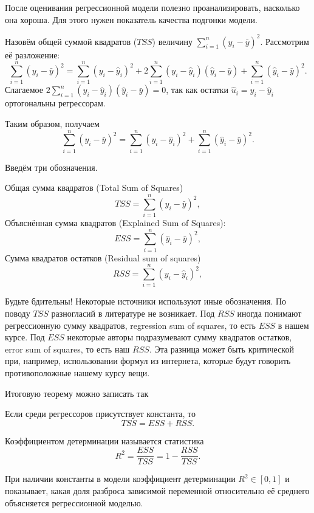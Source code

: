 \documentclass[12pt]{article}
\newcommand{\hu}{\hat{u}}
\newcommand{\hy}{\hat{y}}
\newcommand{\RSS}{RSS}
\newcommand{\ESS}{ESS}
\newcommand{\TSS}{TSS}
\begin{document}
После оценивания регрессионной модели полезно проанализировать, насколько она хороша. Для этого нужен показатель качества подгонки модели.

Назовём общей суммой квадратов ($\TSS$) величину $\sum_{i=1}^n (y_i - \bar{y})^2$. Рассмотрим её разложение:
\[
\sum_{i=1}^n (y_i - \bar{y})^2 = \sum_{i=1}^n (y_i - \hy_i)^2 + 2\sum_{i=1}^n (y_i - \hy_i)(\hy_i - \bar{y}) + \sum_{i=1}^n (\hy_i - \bar{y})^2.
\]
Слагаемое $2\sum_{i=1}^n (y_i - \hy_i)(\hy_i - \bar{y}) = 0$, так как остатки $\hu_i = y_i - \hy_i$ ортогональны регрессорам.

Таким образом, получаем
\[
\sum_{i=1}^n (y_i - \bar{y})^2 = \sum_{i=1}^n (y_i - \hy_i)^2 + \sum_{i=1}^n (\hy_i - \bar{y})^2.
\]

Введём три обозначения.


Общая сумма квадратов (Total Sum of Squares)
\[
\TSS = \sum_{i=1}^n (y_i - \bar{y})^2,
\]
Объяснённая сумма квадратов (Explained Sum of Squares):
\[
\ESS = \sum_{i=1}^n (\hy_i - \bar{y})^2,
\]
Сумма квадратов остатков (Residual sum of squares)
\[
\RSS = \sum_{i=1}^n (y_i - \hy_i)^2,
\]

Будьте бдительны! 
Некоторые источники используют иные обозначения. По поводу $\TSS$ разногласий в литературе не возникает. 
Под $\RSS$ иногда понимают регрессионную сумму квадратов, regression sum of squares, то есть $\ESS$ в нашем курсе. 
Под $\ESS$ некоторые авторы подразумевают сумму квадратов остатков, error sum of squares, то есть наш $\RSS$. 
Эта разница может быть критической при, например, использовании формул из интернета, которые будут говорить противоположные нашему курсу вещи.

Итоговую теорему можно записать так
\begin{theorem}
Если среди регрессоров присутствует константа, то
\[
\label{tss}
    \TSS = \ESS + \RSS.
\]
\end{theorem}

\begin{definition}
Коэффициентом детерминации называется статистика 
\[
R^2 = \frac{\ESS}{\TSS} = 1 - \frac{\RSS}{\TSS}.
\]    
\end{definition}



При наличии константы в модели коэффициент детерминации $R^2 \in [0,1]$ и показывает, какая доля разброса зависимой переменной относительно её среднего объясняется регрессионной моделью.


\end{document}
